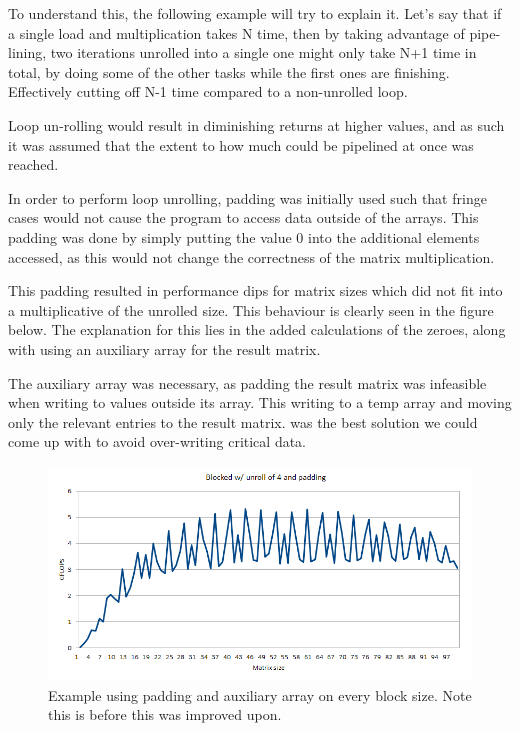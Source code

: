 \documentclass[a4paper,11pt,oneside]{book}
\begin{document}
To understand this, the following example will try to explain it. Let's say that
if a single load and multiplication takes N time, then by taking advantage 
of pipe-lining, two iterations unrolled into a single one might only take N+1 time 
in total, by doing some of the other tasks while the first ones are finishing.
Effectively cutting off N-1 time compared to a non-unrolled loop. 


Loop un-rolling would result in diminishing returns at higher values, and as such
it was assumed that the extent to how much could be pipelined at once was reached.


In order to perform loop unrolling, padding was initially used such that fringe
cases would not cause the program to access data outside of the arrays. This
padding was done by simply putting the value 0 into the additional elements
accessed, as this would not change the correctness of the matrix multiplication.

This padding resulted in performance dips for matrix sizes which did not fit
into a multiplicative of the unrolled size. This behaviour is clearly seen in
the figure below. The explanation for this lies in the added calculations of the
zeroes, along with using an auxiliary array for the result matrix.

The auxiliary array was necessary, as padding the result matrix was infeasible
when writing to values outside its array. This writing to a temp array and
moving only the relevant entries to the result matrix. was the best solution 
we could come up with to avoid over-writing critical data.

\begin{figure}
  \centering
  \includegraphics[width=0.9\linewidth]{graph-blocked-padding.png}
  \caption{Example using padding and auxiliary array on every block size. Note 
  this is before this was improved upon.}
  \centering
  \label{fig:sub1}
\end{figure}
\end{document}
